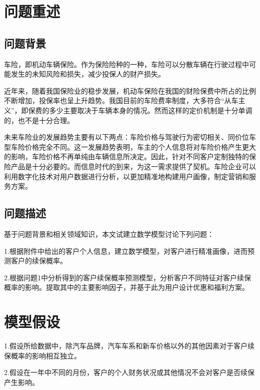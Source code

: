 \documentclass[UTF8,12pt,songti]{ctexart}
\title{}  %
\author{}   %
\date{}       %
\begin{document}
\maketitle        %
\renewcommand{\contentsname}{目录} %
\tableofcontents
\newpage

\section{问题重述}
\subsection{问题背景}
车险，即机动车辆保险。作为保险险种的一种，车险可以分散车辆在行驶过程中可能发生的未知风险和损失，减少投保人的财产损失。\par
近年来，随着我国保险业的稳步发展，机动车保险在我国的财险保费中所占的比例不断增加，投保率也呈上升趋势。我国目前的车险费率制度，大多符合“从车主义”，即保费的多少主要取决于车辆本身的情况。然而这样的定价机制是十分单调的，也不是十分合理。\par
未来车险业的发展趋势主要有以下两点：车险价格与驾驶行为密切相关、同价位车型车险价格完全不同。这一发展趋势表明，车主的个人信息将对车险价格产生更大的影响，车险价格不再单纯由车辆信息所决定。因此，针对不同客户定制独特的保险产品是十分必要的。而信息时代的到来，为这一需求提供了契机。车险企业可以利用数字化技术对用户数据进行分析，以更加精准地构建用户画像，制定营销和服务方案。
\subsection{问题描述}
基于问题背景和相关领域知识，本文试建立数学模型讨论下列问题：\par
1.根据附件中给出的客户个人信息，建立数学模型，对客户进行精准画像，进而预测客户的续保概率。\par
2.根据问题1中分析得到的客户续保概率预测模型，分析客户不同特征对客户续保概率的影响。提取其中的主要影响因子，并基于此为用户设计优惠和福利方案。
\section{模型假设}
1.假设所给数据中，除汽车品牌，汽车车系和新车价格以外的其他因素对于客户续保概率的影响相互独立。\par
2.假设在一年中不同的月份，客户的个人财务状况或其他情况不会对客户是否续保产生影响。
\end{document}
